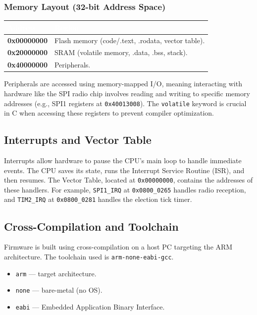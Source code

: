 \documentclass[11pt,a4paper]{article}
\newcommand{\citeref}[1]{}
\begin{document}
\subsubsection*{Memory Layout (32-bit Address Space)}

\begin{longtable}{@{}>{\ttfamily\bfseries}p{3cm}p{10cm}@{}}
\toprule
\rowcolor{havennavy}
\textcolor{white}{\normalfont\bfseries Address} & \textcolor{white}{Region} \\
\midrule
\endhead
0x00000000 & Flash memory (code/.text, .rodata, vector table). \\
0x20000000 & SRAM (volatile memory, .data, .bss, stack). \\
0x40000000 & Peripherals. \\
\bottomrule
\end{longtable}

Peripherals are accessed using memory-mapped I/O, meaning interacting with hardware like the SPI radio chip involves reading and writing to specific memory addresses (e.g., SPI1 registers at \texttt{0x40013008}).\citeref{4} The \texttt{volatile} keyword is crucial in C when accessing these registers to prevent compiler optimization.\citeref{4}

\subsection{Interrupts and Vector Table}

Interrupts allow hardware to pause the CPU's main loop to handle immediate events. The CPU saves its state, runs the Interrupt Service Routine (ISR), and then resumes.\citeref{4} The Vector Table, located at \texttt{0x00000000}, contains the addresses of these handlers.\citeref{4} For example, \texttt{SPI1\_IRQ} at \texttt{0x0800\_0265} handles radio reception, and \texttt{TIM2\_IRQ} at \texttt{0x0800\_0281} handles the election tick timer.\citeref{4}

\subsection{Cross-Compilation and Toolchain}

Firmware is built using cross-compilation on a host PC targeting the ARM architecture.\citeref{4} The toolchain used is \texttt{arm-none-eabi-gcc}.\citeref{4}

\begin{itemize}
\item \texttt{arm} --- target architecture.
\item \texttt{none} --- bare-metal (no OS).
\item \texttt{eabi} --- Embedded Application Binary Interface.
\end{itemize}
\end{document}
